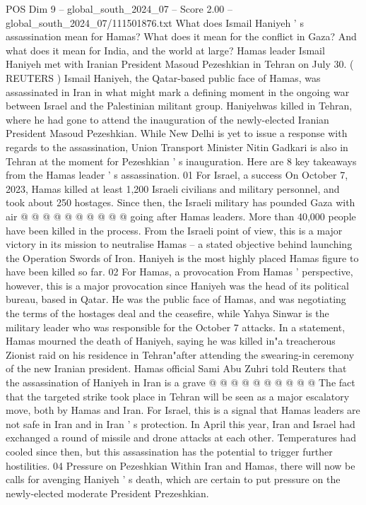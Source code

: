 \begin{textsample}{POS Dim 9 – global\_south\_2024\_07 – Score 2.00 – global\_south\_2024\_07/111501876.txt}  \label{ex:f9_pos_106}
What does Ismail Haniyeh ' s assassination mean for Hamas?
What does it mean for the conflict in Gaza?
And what does it mean for India, and the world at large?
Hamas leader Ismail Haniyeh met with Iranian President Masoud Pezeshkian in Tehran on July 30. ( REUTERS ) Ismail Haniyeh, the Qatar-based public face of Hamas, was assassinated in Iran in what might mark a defining moment in the ongoing war between Israel and the Palestinian militant group.
Haniyehwas killed in Tehran, where he had gone to attend the inauguration of the newly-elected Iranian President Masoud Pezeshkian.
While New Delhi is yet to issue a response with regards to the assassination, Union Transport Minister Nitin Gadkari is also in Tehran at the moment for Pezeshkian ' s inauguration.
Here are 8 key takeaways from the Hamas leader ' s assassination. 01 For Israel, a success On October 7, 2023, Hamas killed at least 1,200 Israeli civilians and military personnel, and took about 250 hostages.
Since then, the Israeli military has pounded Gaza with air @ @ @ @ @ @ @ @ @ @ going after Hamas leaders.
More than 40,000 people have been killed in the process.
From the Israeli point of view, this is a major victory in its mission to neutralise Hamas -- a stated objective behind launching the Operation Swords of Iron.
Haniyeh is the most highly placed Hamas figure to have been killed so far. 02 For Hamas, a provocation From Hamas ' perspective, however, this is a major provocation since Haniyeh was the head of its political bureau, based in Qatar.
He was the public face of Hamas, and was negotiating the terms of the hostages deal and the ceasefire, while Yahya Sinwar is the military leader who was responsible for the October 7 attacks.
In a statement, Hamas mourned the death of Haniyeh, saying he was killed in"a treacherous Zionist raid on his residence in Tehran"after attending the swearing-in ceremony of the new Iranian president.
Hamas official Sami Abu Zuhri told Reuters that the assassination of Haniyeh in Iran is a grave @ @ @ @ @ @ @ @ @ @ The fact that the targeted strike took place in Tehran will be seen as a major escalatory move, both by Hamas and Iran.
For Israel, this is a signal that Hamas leaders are not safe in Iran and in Iran ' s protection.
In April this year, Iran and Israel had exchanged a round of missile and drone attacks at each other.
Temperatures had cooled since then, but this assassination has the potential to trigger further hostilities. 04 Pressure on Pezeshkian Within Iran and Hamas, there will now be calls for avenging Haniyeh ' s death, which are certain to put pressure on the newly-elected moderate President Prezeshkian.

\end{textsample}
